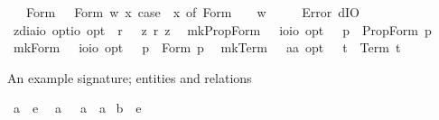 \begin{isabellebody}
\ \ {\isacharbar}\ Form\ {\isasymphi}\ {\isasymRightarrow}\ Form\ {\isacharparenleft}{\isasymlambda}w{\isachardot}\ {\isasymexists}x{\isachardot}\ case\ {\isacharparenleft}{\isasymPhi}\ x{\isacharparenright}\ of\ Form\ {\isasympsi}\ {\isasymRightarrow}\ {\isasympsi}\ w{\isacharparenright}\isanewline
\ \ {\isacharbar}\ {\isacharunderscore}\ {\isasymRightarrow}\ Error\ dIO{\isachardoublequoteclose}\isanewline
{}\isamarkupfalse%
\ z{\isacharunderscore}dia{\isacharcolon}{\isacharcolon}{\isachardoublequoteopen}io\ opt{\isasymRightarrow}io\ opt{\isachardoublequoteclose}\ \ {\isachardoublequoteopen}{\isasymdiamond}\isactrlsup r\ {\isasymphi}\ {\isasymequiv}\ {\isasymnot}\isactrlsup z\ {\isasymbox}\isactrlsup r\ {\isacharparenleft}{\isasymnot}\isactrlsup z\ {\isasymphi}{\isacharparenright}{\isachardoublequoteclose}%
\isamarkuptrue%
\isamarkupfalse%
\ mkPropForm\ {\isacharcolon}{\isacharcolon}\ \ {\isachardoublequoteopen}io{\isasymRightarrow}io\ opt{\isachardoublequoteclose}\ \ \ {\isachardoublequoteopen}{\isacharcomma}p{\isacharcomma}\ {\isasymequiv}\ PropForm\ p{\isachardoublequoteclose}\ \isanewline
{}\isamarkupfalse%
\ mkForm\ {\isacharcolon}{\isacharcolon}\ \ {\isachardoublequoteopen}io{\isasymRightarrow}io\ opt{\isachardoublequoteclose}\ \ \ {\isachardoublequoteopen}{\isacharsemicolon}p{\isacharsemicolon}\ {\isasymequiv}\ Form\ p{\isachardoublequoteclose}\ \isanewline
{}\isamarkupfalse%
\ mkTerm\ {\isacharcolon}{\isacharcolon}\ \ {\isachardoublequoteopen}{\isacharprime}a{\isasymRightarrow}{\isacharprime}a\ opt{\isachardoublequoteclose}\ \ \ {\isachardoublequoteopen}{\isachardot}t{\isachardot}\ {\isasymequiv}\ Term\ t{\isachardoublequoteclose}%
\isamarkuptrue%
%
\begin{isamarkuptext}%
An example signature; entities and relations%
\end{isamarkuptext}%
\isamarkuptrue%
\isamarkupfalse%
\ a{\isacharunderscore}{}\ {\isacharcolon}{\isacharcolon}\ {\isachardoublequoteopen}e{\isachardoublequoteclose}\ \isamarkupfalse%
\ a\ \ \ {\isachardoublequoteopen}a\ {\isasymequiv}\ {\isachardot}a{\isacharunderscore}{}{\isachardot}{\isachardoublequoteclose}\isanewline
{}\isamarkupfalse%
\ b{\isacharunderscore}{}\ {\isacharcolon}{\isacharcolon}\ {\isachardoublequoteopen}e{\isachardoublequoteclose}\ \isamarkupfalse%

\end{isabellebody}
